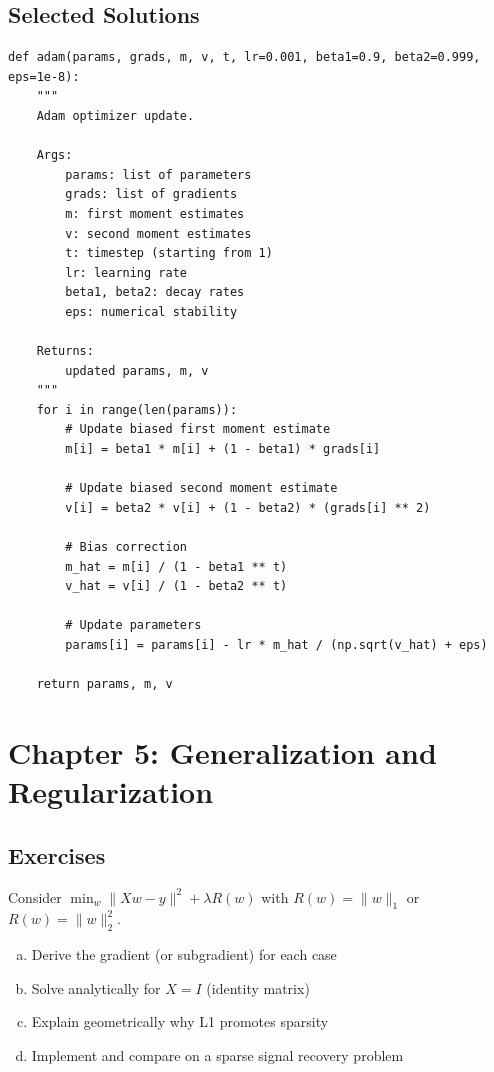 \documentclass[../main.tex]{subfiles}
\begin{document}
\subsection{Selected Solutions}

\begin{solution}[Exercise 4.1(a)]
\begin{verbatim}
def adam(params, grads, m, v, t, lr=0.001, beta1=0.9, beta2=0.999, eps=1e-8):
    """
    Adam optimizer update.

    Args:
        params: list of parameters
        grads: list of gradients
        m: first moment estimates
        v: second moment estimates
        t: timestep (starting from 1)
        lr: learning rate
        beta1, beta2: decay rates
        eps: numerical stability

    Returns:
        updated params, m, v
    """
    for i in range(len(params)):
        # Update biased first moment estimate
        m[i] = beta1 * m[i] + (1 - beta1) * grads[i]

        # Update biased second moment estimate
        v[i] = beta2 * v[i] + (1 - beta2) * (grads[i] ** 2)

        # Bias correction
        m_hat = m[i] / (1 - beta1 ** t)
        v_hat = v[i] / (1 - beta2 ** t)

        # Update parameters
        params[i] = params[i] - lr * m_hat / (np.sqrt(v_hat) + eps)

    return params, m, v
\end{verbatim}
\end{solution}

\section{Chapter 5: Generalization and Regularization}\label{sec:ex-regularization}

\subsection{Exercises}

\begin{simpleexercise}[L1 vs L2 Regularization]
Consider $\min_w \|Xw - y\|^2 + \lambda R(w)$ with $R(w) = \|w\|_1$ or $R(w) = \|w\|_2^2$.
\begin{enumerate}[(a)]
    \item Derive the gradient (or subgradient) for each case
    \item Solve analytically for $X = I$ (identity matrix)
    \item Explain geometrically why L1 promotes sparsity
    \item Implement and compare on a sparse signal recovery problem
\end{enumerate}
\end{simpleexercise}
\end{document}
